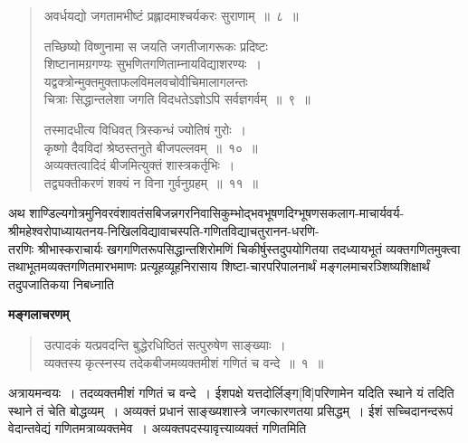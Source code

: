 \documentclass[11pt, openany]{book}
\makeatletter
\newcommand{\devanagarinumeral}[1]{%
 \devanagaridigits{\number\csname c@#1\endcsname}}
\makeatother
\begin{document}
\afterpage{\fancyhead[LE,RO]{\thepage}}
\cfoot{}
\newpage
\renewcommand{\thepage}{\devanagarinumeral{page}}
\setcounter{page}{2}
\pagestyle{fancy}
\begin{quote}
    \q
अवर्धयद्यो जगतामभीष्टं प्रह्लादमाश्चर्यकरः सुराणाम्~॥~८~॥\\
\vspace{-3mm}

तच्छिष्यो विष्णुनामा स जयति जगतीजागरूकः प्रदिष्टः \\
शिष्टानामग्रगण्यः सुभणितगणिताम्नायविद्याशरण्यः~। \\
यद्वक्त्रोन्मुक्तमुक्ताफलविमलवचोवीचिमालागलन्तः \\
चित्राः सिद्धान्तलेशा जगति विदधतेऽज्ञोऽपि सर्वज्ञगर्वम्~॥~९~॥\\
\vspace{-3mm}

तस्मादधीत्य विधिवत् त्रिस्कन्धं ज्योतिषं गुरोः~। \\
कृष्णो दैवविदां श्रेष्ठस्तनुते बीजपल्लवम्~॥~१०~॥\\
अव्यक्तत्वादिदं बीजमित्युक्तं शास्त्रकर्तृभिः~। \\
तद्व्यक्तीकरणं शक्यं न विना गुर्वनुग्रहम्~॥~११~॥
\end{quote}
\onehalfspacing
\s\noindent अथ शाण्डिल्यगोत्रमुनिवरवंशावतंसबिजन्नगरनिवासिकुम्भोद्भवभूषणदिग्भूषणसकलाग-माचार्यवर्य-श्रीमहेश्वरोपाध्यायतनय-निखिलविद्यावाचस्पति-गणितविद्याचतुरानन-धरणि-\\
तरणिः श्रीभास्कराचार्यः खगगणितरूपसिद्धान्तशिरोमणिं
चिकीर्षुस्तदुपयोगितया तदध्यायभूतं व्यक्तगणितमुक्त्वा तथाभूतमव्यक्तगणितमारभमाणः 
प्रत्यूहव्यूहनिरासाय शिष्टा-चारपरिपालनार्थं मङ्गलमाचरञ्शिष्यशिक्षार्थं
तदुपजातिकया निबध्नाति\textemdash  \\

\begin{center}
   \bqt \textbf{मङ्गलाचरणम्} 
\end{center}
\vspace{-2mm} 
 
 \label{1}
\begin{quote}
    \ab
    उत्पादकं यत्प्रवदन्ति बुद्धेरधिष्ठितं सत्पुरुषेण साङ्ख्याः~।\\
 व्यक्तस्य कृत्स्नस्य तदेकबीजमव्यक्तमीशं गणितं च वन्दे~॥~१~॥
\end{quote}
 
 अत्रायमन्वयः~। तदव्यक्तमीशं गणितं च वन्दे~। ईशपक्षे यत्तदोर्लिङ्ग[वि]परिणामेन यदिति स्थाने यं तदिति स्थाने तं चेति बोद्धव्यम्~। अव्यक्तं
प्रधानं साङ्ख्यशास्त्रे जगत्कारणतया प्रसिद्धम्~। ईशं सच्चिदानन्दरूपं
वेदान्तवेद्यं गणितमत्राव्यक्तमेव~। अव्यक्तपदस्यावृत्त्याव्यक्तं
गणितमिति
\newpage
 
\end{document}
